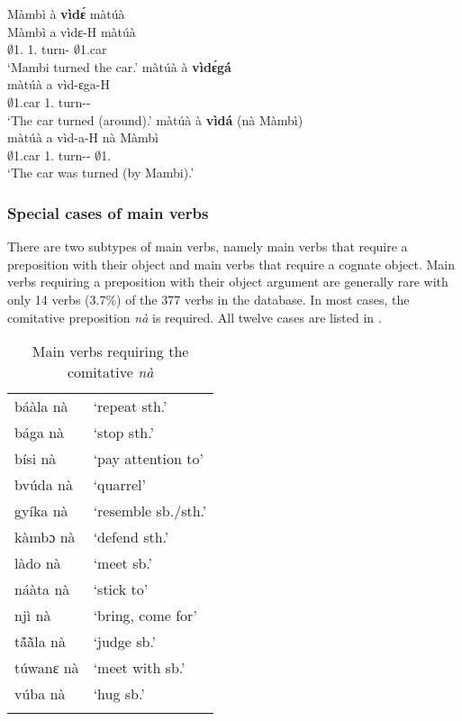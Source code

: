 \ea \label{Vale}
  \ea  \label{Valea}
   \glll  Màmbì à {\bfseries vìdɛ́} màtúà  \\
          Màmbì a vìdɛ-H màtúà \\
          $\emptyset$1.{\PN} 1.{\PST} turn-{\R} $\emptyset$1.car   \\
    \trans `Mambi turned the car.'
\ex\label{Valeb}
\glll  màtúà à {\bfseries vìdɛ́gá} \\
      màtúà a vìd-ɛga-H  \\
       $\emptyset$1.car 1.{\PST} turn-{\AUTOCAUS}-{\PST}     \\
    \trans `The car turned (around).'
\ex\label{Valec}
\glll  màtúà à {\bfseries vìdá} (nà Màmbì) \\
      màtúà a vìd-a-H nà Màmbì \\
        $\emptyset$1.car 1.{\PST} turn-{\PASS}-{\PST} {\COM} $\emptyset$1.{\PN}    \\
    \trans `The car was turned (by Mambi).'
 \z
\z

\subsubsection{Special cases of main verbs}

There are two subtypes of main verbs, namely main verbs that require a preposition with their object and main verbs that require a cognate object.
Main verbs requiring a preposition with their object argument are generally rare with only 14 verbs (3.7\%) of the 377 verbs in the database. In most cases, the comitative preposition {\itshape nà} is required. All twelve cases are listed in .

\begin{table}
\begin{tabular}{ll}
 \lsptoprule
báàla nà &	 `repeat sth.' \\
bága nà & 	`stop sth.' \\
bísi nà & 	`pay attention to' \\
bvúda nà & 	`quarrel' \\
gyíka nà & 	`resemble sb./sth.' \\
kàmbɔ nà	 & `defend sth.' \\
làdo nà & 	`meet sb.' \\
náàta nà	&  `stick to' \\
njì nà & 	`bring, come for' \\
tã́ã̀la nà & 	`judge sb.' \\
túwanɛ nà	 & `meet with sb.' \\
vúba nà & 	`hug sb.' \\
 \lspbottomrule
\end{tabular}
\caption{Main verbs requiring the comitative {\itshape nà}}
\label{Tab:Verbsna}
\end{table}

